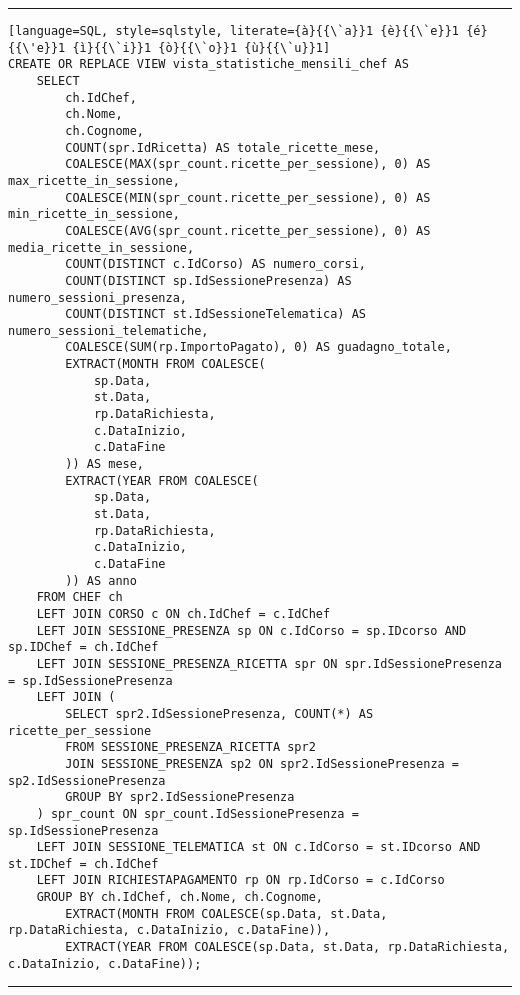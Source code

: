 \noindent\rule{\textwidth}{0.4pt}
\begin{lstlisting}[language=SQL, style=sqlstyle, literate={à}{{\`a}}1 {è}{{\`e}}1 {é}{{\'e}}1 {ì}{{\`i}}1 {ò}{{\`o}}1 {ù}{{\`u}}1]
CREATE OR REPLACE VIEW vista_statistiche_mensili_chef AS
    SELECT
        ch.IdChef,
        ch.Nome,
        ch.Cognome,
        COUNT(spr.IdRicetta) AS totale_ricette_mese,
        COALESCE(MAX(spr_count.ricette_per_sessione), 0) AS max_ricette_in_sessione,
        COALESCE(MIN(spr_count.ricette_per_sessione), 0) AS min_ricette_in_sessione,
        COALESCE(AVG(spr_count.ricette_per_sessione), 0) AS media_ricette_in_sessione,
        COUNT(DISTINCT c.IdCorso) AS numero_corsi,
        COUNT(DISTINCT sp.IdSessionePresenza) AS numero_sessioni_presenza,
        COUNT(DISTINCT st.IdSessioneTelematica) AS numero_sessioni_telematiche,
        COALESCE(SUM(rp.ImportoPagato), 0) AS guadagno_totale,
        EXTRACT(MONTH FROM COALESCE(
            sp.Data,
            st.Data,
            rp.DataRichiesta,
            c.DataInizio,  
            c.DataFine      
        )) AS mese,
        EXTRACT(YEAR FROM COALESCE(
            sp.Data,
            st.Data,
            rp.DataRichiesta,
            c.DataInizio,
            c.DataFine
        )) AS anno
    FROM CHEF ch
    LEFT JOIN CORSO c ON ch.IdChef = c.IdChef
    LEFT JOIN SESSIONE_PRESENZA sp ON c.IdCorso = sp.IDcorso AND sp.IDChef = ch.IdChef
    LEFT JOIN SESSIONE_PRESENZA_RICETTA spr ON spr.IdSessionePresenza = sp.IdSessionePresenza
    LEFT JOIN (
        SELECT spr2.IdSessionePresenza, COUNT(*) AS ricette_per_sessione
        FROM SESSIONE_PRESENZA_RICETTA spr2
        JOIN SESSIONE_PRESENZA sp2 ON spr2.IdSessionePresenza = sp2.IdSessionePresenza
        GROUP BY spr2.IdSessionePresenza
    ) spr_count ON spr_count.IdSessionePresenza = sp.IdSessionePresenza
    LEFT JOIN SESSIONE_TELEMATICA st ON c.IdCorso = st.IDcorso AND st.IDChef = ch.IdChef
    LEFT JOIN RICHIESTAPAGAMENTO rp ON rp.IdCorso = c.IdCorso
    GROUP BY ch.IdChef, ch.Nome, ch.Cognome,
        EXTRACT(MONTH FROM COALESCE(sp.Data, st.Data, rp.DataRichiesta, c.DataInizio, c.DataFine)),
        EXTRACT(YEAR FROM COALESCE(sp.Data, st.Data, rp.DataRichiesta, c.DataInizio, c.DataFine));
\end{lstlisting}
\noindent\rule{\textwidth}{0.4pt}

